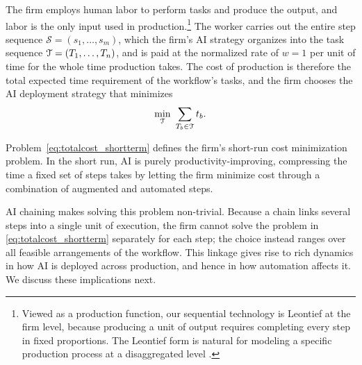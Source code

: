 The firm employs human labor to perform tasks and produce the output, and labor is the only input used in production.\footnote{
Viewed as a production function, our sequential technology is Leontief at the firm level, because producing a unit of output requires completing every step in fixed proportions.
The Leontief form is natural for modeling a specific production process at a disaggregated level \citep{deloecker2021io}.
}
The worker carries out the entire step sequence $\mathcal{S} = (s_1, \dotsc, s_m)$, which the firm's AI strategy organizes into the task sequence $\mathcal{T} = (T_1, \dotsc, T_n)$, and is paid at the normalized rate of $w = 1$ per unit of time for the whole time production takes.
The cost of production is therefore the total expected time requirement of the workflow's tasks, and the firm chooses the AI deployment strategy that minimizes
\begin{align}
\label{eq:totalcost_shortterm}
\min_{\mathcal{T}} \ \sum_{T_b \in \mathcal{T}} t_{b}.
\end{align}

Problem~\eqref{eq:totalcost_shortterm} defines the firm's short-run cost minimization problem.
In the short run, AI is purely productivity-improving, compressing the time a fixed set of steps takes by letting the firm minimize cost through a combination of augmented and automated steps.

AI chaining makes solving this problem non-trivial.
Because a chain links several steps into a single unit of execution, the firm cannot solve the problem in \eqref{eq:totalcost_shortterm} separately for each step; the choice instead ranges over all feasible arrangements of the workflow.
This linkage gives rise to rich dynamics in how AI is deployed across production, and hence in how automation affects it.
We discuss these implications next.
